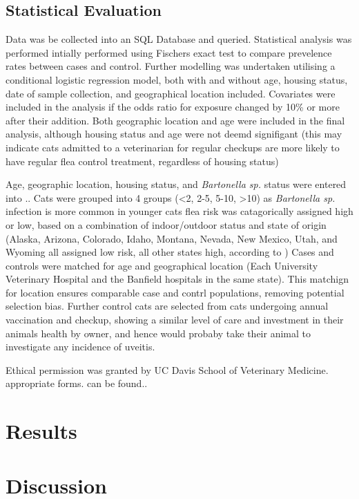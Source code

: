 \documentclass[11pt,twocolumn]{article}
\begin{document}
	\subsection{Statistical Evaluation}
		Data was be collected into an SQL Database and queried. Statistical analysis was performed intially performed using Fischers exact test to compare prevelence rates between cases and control. 
		Further modelling was undertaken utilising a conditional logistic regression model, both with and without age, housing status, date of sample collection, and geographical location included. 
		Covariates were included in the analysis if the odds ratio for exposure changed by 10\% or more after their addition.
		Both geographic location and age were included in the final analysis, although housing status and age were not deemd signifigant (this may indicate cats admitted to a veterinarian for regular checkups are more likely to have regular flea control treatment, regardless of housing status)

		Age, geographic location, housing status, and \emph{Bartonella sp.} status were entered into ..
		Cats were grouped into 4 groups (<2, 2-5, 5-10, >10) as \emph{Bartonella sp.} infection is more common in younger cats
		flea risk was catagorically assigned high or low, based on a combination of indoor/outdoor status and state of origin (Alaska, Arizona, Colorado, Idaho, Montana, Nevada, New Mexico, Utah, and Wyoming all assigned low risk, all other states high, according to \cite{Jameson1995a})
		Cases and controls were matched for age and geographical location (Each University Veterinary Hospital and the Banfield hospitals in the same state).
		This matchign for location ensures comparable case and contrl populations, removing potential selection bias. Further control cats are selected from cats undergoing annual vaccination and checkup, showing a similar level of care and investment in their animals health by owner, and hence would probaby take their animal to investigate any incidence of uveitis. %




	Ethical permission was granted by UC Davis School of Veterinary Medicine. appropriate forms. can be found..

\section{Results}
\section{Discussion}
\end{document}
